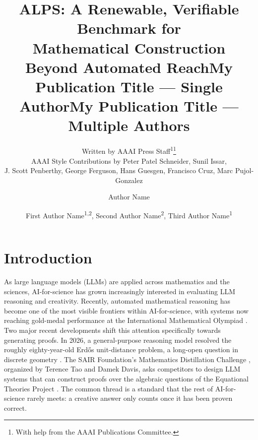 \documentclass[letterpaper]{article} %
\title{ALPS: A Renewable, Verifiable Benchmark for \\ Mathematical Construction Beyond Automated Reach}
\author{
    Written by AAAI Press Staff\textsuperscript{\rm 1}\thanks{With help from the AAAI Publications Committee.}\\
    AAAI Style Contributions by Peter Patel Schneider,
    Sunil Issar,\\
    J. Scott Penberthy,
    George Ferguson,
    Hans Guesgen,
    Francisco Cruz\equalcontrib\corresponding,
    Marc Pujol-Gonzalez\equalcontrib\corresponding
}
\title{My Publication Title --- Single Author}
\author {
    Author Name
}
\title{My Publication Title --- Multiple Authors}
\author {
    First Author Name\textsuperscript{\rm 1,\rm 2}\equalcontrib,
    Second Author Name\textsuperscript{\rm 2}\equalcontrib,
    Third Author Name\textsuperscript{\rm 1}\corresponding
}
\begin{document}
\maketitle

\begin{abstract}

\end{abstract}


\section{Introduction}


As large language models (LLMs) are applied across mathematics and the sciences, AI-for-science has grown increasingly interested in evaluating LLM reasoning and creativity. Recently, automated mathematical reasoning has become one of the most visible frontiers within AI-for-science, with systems now reaching gold-medal performance at the International Mathematical Olympiad \citep{deepmind2025imo}. Two major recent developments shift this attention specifically towards generating proofs. In 2026, a general-purpose reasoning model resolved the roughly eighty-year-old Erdős unit-distance problem, a long-open question in discrete geometry \citep{openai2026unitdistance}. The SAIR Foundation's Mathematics Distillation Challenge \citep{tao2026distillation}, organized by Terence Tao and Damek Davis, asks competitors to design LLM systems that can construct proofs over the algebraic questions of the Equational Theories Project \citep{bolan2025equational}. The common thread is a standard that the rest of AI-for-science rarely meets: a creative answer only counts once it has been proven correct. 
\end{document}
